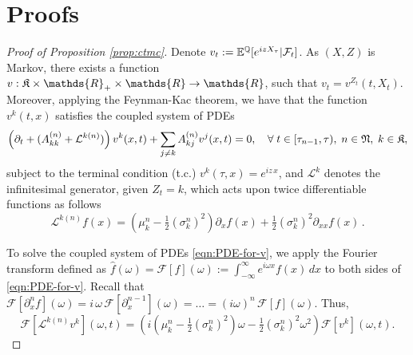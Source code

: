 \documentclass[onefignum,onetabnum]{siamonline190516}
\begin{document}
\section{Proofs}
\begin{proof}[{Proof of Proposition \ref{prop:ctmc}}]

Denote $v_t:={{\mathbb{E}}^{\mathbb{Q}}}[e^{iz X_{\tau}}|\mathcal{F}_t]$. As $(X,Z)$ is Markov, there exists a function $v:\K\times\mathds{R}_+\times\mathds{R}\to\mathds{R}$, such that $v_t=v^{Z_t}(t,X_t)$.  Moreover, applying the Feynman-Kac theorem, we have that the function $v^k(t,x)$ satisfies the coupled system of PDEs
\begin{equation}
    \left(\partial_t + (A_{kk}^{(n)} + \mathcal{L}^{k(n)})\right)v^k(x, t) + \sum_{j \neq k} A_{kj}^{(n)} v^j(x,t) = 0,\quad \forall\;t\in[\tau_{n-1},\tau),\; n\in\mathfrak{N},\; k\in\K,
    \label{eqn:PDE-for-v}%
\end{equation}%
subject to the terminal condition (t.c.) $v^k(\tau,x) = e^{iz\,x}$, and $\mathcal{L}^k$ denotes the infinitesimal generator, given $Z_t=k$, which acts upon twice differentiable functions as follows
\begin{equation}
\mathcal{L}^{k(n)} f(x) = \left(\mu_k^n - \tfrac{1}{2} (\sigma_k^n)^2\right) \partial_x f(x)    + \tfrac{1}{2} (\sigma_k^n)^2 \partial_{xx} f(x)    \,.
\end{equation}

To solve the coupled system of PDEs \eqref{eqn:PDE-for-v}, we apply the Fourier transform defined as $\hat{f}(\omega) = \mathcal{F}[f](\omega):= \int_{-\infty}^{\infty} e^{i \omega x}f(x)\,dx$ to both sides of \eqref{eqn:PDE-for-v}. Recall that $
    \mathcal{F}[\partial_x^n f](\omega)
    = i\, \omega \, \mathcal{F}[\partial_x^{n-1}](\omega)
    = \dots
    = (i \omega)^n\, \mathcal{F}[f](\omega)$. Thus,
\begin{equation}
    \mathcal{F}[\mathcal{L}^{k(n)} v^k](\omega, t) = \left(i \left(\mu_k^n - \tfrac{1}{2} (\sigma_k^n)^2\right) \omega - \tfrac{1}{2} (\sigma_k^n)^2 \omega ^2 \right) \mathcal{F}[v^k](\omega, t).
\end{equation}


\end{proof}
\end{document}

